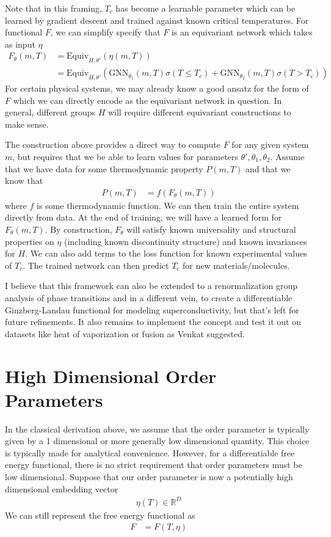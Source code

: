 \documentclass[book.tex]{subfiles}
\begin{document}
Note that in this framing, $T_c$ has become a learnable parameter which can be learned by gradient descent and trained against known critical temperatures. For functional $F$, we can simplify specify that $F$ is an equivariant network which takes as input $\eta$
\begin{align}
F_\theta(m, T) &= \textrm{Equiv}_{H,\theta'}(\eta(m, T)) \\
&= \textrm{Equiv}_{H,\theta'}(\textrm{GNN}_{\theta_1}(m, T)\sigma(T \leq T_c) + \textrm{GNN}_{\theta_2}(m, T)\sigma(T > T_c))
\end{align}
For certain physical systems, we may already know a good ansatz for the form of $F$ which we can directly encode as the equivariant network in question. In general, different groups $H$ will require different equivariant constructions to make sense.

The construction above provides a direct way to compute $F$ for any given system $m$, but requires that we be able to learn values for parameters $\theta', \theta_1, \theta_2$. Assume that we have data for some thermodynamic property $P(m, T)$ and that we know that  
\begin{align}
P(m, T) &= f(F_\theta(m, T))
\end{align}
where $f$ is some thermodynamic function. We can then train the entire system directly from data. At the end of training, we will have a learned form for $F_\theta(m, T)$. By construction, $F_\theta$ will satisfy known universality and structural properties on $\eta$ (including known discontinuity structure) and known invariances for $H$. We can also add terms to the loss function for known experimental values of $T_c$. The trained network can then predict $T_c$ for new materials/molecules.

I believe that this framework can also be extended to a renormalization group analysis of phase transitions and in a different vein, to create a differentiable Ginzberg-Landau functional for modeling superconductivity, but that's left for future refinements. It also remains to implement the concept and test it out on datasets like heat of vaporization or fusion as Venkat suggested.

\section{High Dimensional Order Parameters}

In the classical derivation above, we assume that the order parameter is typically given by a 1 dimensional or more generally low dimensional quantity. This choice is typically made for analytical convenience. However, for a differentiable free energy functional, there is no strict requirement that order parameters must be low dimensional. Suppose that our order parameter is now a potentially high dimensional embedding vector
\begin{align}
\eta(T) \in \mathbb{R}^D
\end{align}
We can still represent the free energy functional as
\begin{align}
F &= F(T, \eta)
\end{align}
\end{document}

